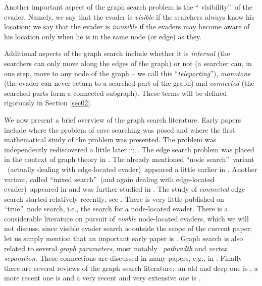 \documentclass[11pt]{article}\usepackage{amsmath}
\begin{document}
Another important aspect of the graph search problem is the \textquotedblleft
visibility\textquotedblright\ of the evader. Namely, we say that the evader is
\emph{visible} if the searchers always know his location; we say that the
evader is \emph{invisible} if the evaders may become aware of his location
only when he is in the same node (or edge) as they.

Additional aspects of the graph search include whether it is \emph{internal}
(the searchers can only move along the edges of the graph) or not (a searcher
can, in one step, move to any node of the graph -- we call this
\textquotedblleft\emph{teleporting}\textquotedblright), \emph{monotone }(the
evader can never return to a searched part of the graph) and \emph{connected}
(the searched parts form a connected subgraph). These terms will be defined
rigorously in Section \ref{sec02}.

We now present a brief overview of the graph search literature. Early papers
include \cite{Breisch} where the problem of cave searching was posed and
\cite{Parsons1} where the first mathematical study of the problem was
presented. The problem was independently rediscovered a little later in
\cite{Petrov}. The edge search problem was placed in the context of graph
theory in \cite{Megiddo}. The already mentioned \textquotedblleft node
search\textquotedblright\ variant \ (actually dealing with edge-located
evader)\ appeared a little earlier in \cite{Kiroussis}. Another variant,
called \textquotedblleft mixed search\textquotedblright\ (and again dealing
with edge-located evader)\ appeared in \cite{Bienstock} and was further
studied in \cite{Takahashi,Yang1}. The study of \emph{connected }edge search
started relatively recently; see \cite{Barriere1, Barriere2, Fomin,
Fraigniaud1, Fraigniaud2, Yang2}. There is very little published on
\textquotedblleft true\textquotedblright\ node search, i.e., the search for a
node-located evader. There is a considerable literature on pursuit of
\emph{visible} node-located evaders, which we will not discuss, since visible
evader search is outside the scope of the current paper; let us simply mention
that an important early paper is \cite{Nowakowski}. Graph search is also
related to several \emph{graph parameters}, most notably \ \emph{pathwidth}
and \emph{vertex separation}. These connections are discussed in many papers,
e.g., in
\cite{BienstockReview,Dendris,Ellis,Kinnersley,Kiroussis,ThilikosParams}.
Finally there are several reviews of the graph search literature:\ an old and
deep one is \cite{BienstockReview}, a more recent one is \cite{Alspach} and a
very recent and very extensive one is \cite{FominThilikos}.
\end{document}
